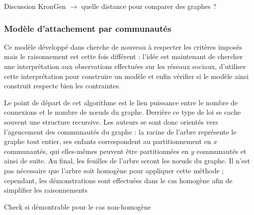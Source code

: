 \documentclass[a4paper]{article}
\begin{document}
Discussion KronGen $\rightarrow$ quelle distance pour comparer des graphes ?

    \subsubsection{Modèle d'attachement par communautés}
    Ce modèle développé dans \cite{Leskovec:2007:GED:1217299.1217301} cherche
    de nouveau à respecter les critères imposés mais le raisonnement est cette
    fois différent : l'idée est maintenant de chercher une interprétation aux
    observations effectuées sur les réseaux sociaux, d'utiliser cette
    interprétation pour construire un modèle et enfin vérifier si le modèle
    ainsi construit respecte bien les contraintes.

    Le point de départ de cet algorithme est le lien puissance entre le nombre
    de connexions et le nombre de n\oe{}uds du graphe. Derrière ce type de loi
    se cache souvent une structure recursive. Les auteurs se sont donc orientés
    vers l'agencement des communautés du graphe : la racine de l'arbre
    représente le graphe tout entier, ses enfants correspondent au
    partitionnement en $x$ communautés, qui elles-mêmes peuvent être
    partitionnées en $y$ communautés et ainsi de suite. Au final, les feuilles
    de l'arbre seront les n\oe{}uds du graphe. Il n'est pas nécessaire que
    l'arbre soit homogène pour appliquer cette méthode ; cependant, les
    démonstrations sont effectuées dans le cas homogène afin de simplifier
    les raisonnements
\begin{todo}
Check si démontrable pour le cas non-homogène
\end{todo}

    
    
\end{document}
